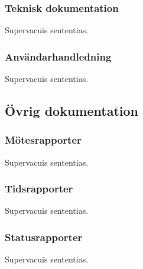 \subsubsection{Teknisk dokumentation}
Supervacuis sententias. 

\subsubsection{Användarhandledning}
Supervacuis sententias.

\subsection{Övrig dokumentation}

\subsubsection{Mötesrapporter}
Supervacuis sententias.

\subsubsection{Tidsrapporter}
Supervacuis sententias.

\subsubsection{Statusrapporter}
Supervacuis sententias. 

